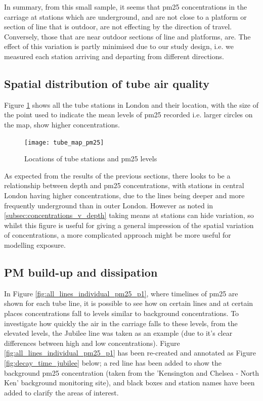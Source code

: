 In summary, from this small sample, it seems that \gls{pm25} concentrations in the carriage at stations which are underground, and are not close to a platform or section of line that is outdoor, are not effecting by the direction of travel. Conversely, those that are near outdoor sections of line and platforms, are. The effect of this variation is partly minimised due to our study design, i.e. we measured each station arriving and departing from different directions.

\subsection{Spatial distribution of tube air quality}
\label{subsec:spatial_distribution_tube_air}

Figure \ref{fig:tube_map_pm25} shows all the tube stations in London and their location, with the size of the point used to indicate the mean levels of \gls{pm25} recorded i.e. larger circles on the map, show higher concentrations.

\begin{figure}[H]
\centering
\texttt{[image: tube\_map\_pm25]}
\caption{Locations of tube stations and \gls{pm25} levels}
\label{fig:tube_map_pm25}
\end{figure}

As expected from the results of the previous sections, there looks to be a relationship between depth and \gls{pm25} concentrations, with stations in central London having higher concentrations, due to the lines being deeper and more frequently underground than in outer London. However as noted in \autoref{subsec:concentrations_v_depth} taking means at stations can hide variation, so whilst this figure is useful for giving a general impression of the spatial variation of concentrations, a more complicated approach might be more useful for modelling exposure.

\subsection{PM build-up and dissipation}
\label{subsec:tube_air_build_up}
In Figure \ref{fig:all_lines_individual_pm25_p1}, where timelines of \gls{pm25} are shown for each tube line, it is possible to see how on certain lines and at certain places concentrations fall to levels similar to background concentrations. To investigate how quickly the air in the carriage falls to these levels, from the elevated levels, the Jubilee line was taken as an example (due to it's clear differences between high and low concentrations). Figure \ref{fig:all_lines_individual_pm25_p1} has been re-created and annotated as Figure \ref{fig:decay_time_jubilee} below; a red line has been added to show the background \gls{pm25} concentration (taken from the 'Kensington and Chelsea - North Ken' background monitoring site), and black boxes and station names have been added to clarify the areas of interest.

